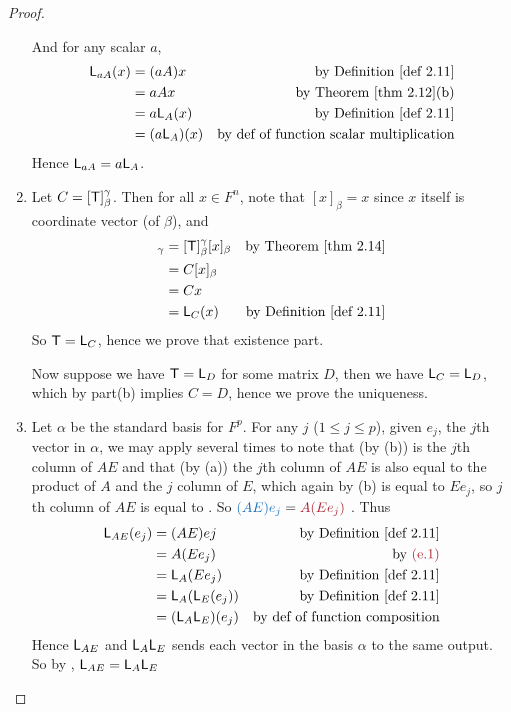 \begin{proof}
\begin{enumerate}
And for any scalar \(a\),
\begin{align*}
    \LMTRAN_{aA}(x) & = (aA)x & \text{by \DEF{2.11}} \\
                       & = aAx & \text{by \THM{2.12}(b)} \\
                       & = a\LMTRAN_A(x) & \text{by \DEF{2.11}} \\
                       & = (a\LMTRAN_A)(x) & \text{by def of function scalar multiplication}
\end{align*}
Hence \(\textsf{L}_{aA} = a\textsf{L}_A\).

\item
Let \(C = [\textsf{T}]_{\beta}^{\gamma}\).
Then for all \(x \in F^n\), note that \([x]_{\beta} = x\) since \(x\) itself is coordinate vector (of \(\beta\)), and
\begin{align*}
    [\T(x)]_{\gamma} & = [\T]_{\beta}^{\gamma}[x]_{\beta} & \text{by \THM{2.14}} \\
                     & = C [x]_{\beta} \\
                     & = C x \\
                     & = \LMTRAN_C(x) & \text{by \DEF{2.11}}
\end{align*}
So \(\textsf{T} = \textsf{L}_C\), hence we prove that existence part.

Now suppose we have \(\textsf{T} = \textsf{L}_D\) for some matrix \(D\), then we have \(\textsf{L}_C = \textsf{L}_D\), which by part(b) implies \(C = D\), hence we prove the uniqueness.

\item
Let \(\alpha\) be the standard basis for \(F^p\).
For any \(j\) (\(1 \le j \le p\)), given \(e_j\), the \(j\)th vector in \(\alpha\), we may apply  several times to note that (by (b))  is the \(j\)th column of \(AE\) and that (by (a)) the \(j\)th column of \(AE\) is also equal to the product of \(A\) and the \(j\) column of \(E\), which again by (b) is equal to \(Ee_j\), so \(j\)th column of \(AE\) is equal to .
So \(\BLUE{(AE)e_j} = \MAROON{A(Ee_j)}\) .
Thus
\begin{align*}
    \LMTRAN_{AE}(e_j) & = (AE)ej & \text{by \DEF{2.11}} \\
                      & = A(Ee_j) & \text{by \MAROON{(e.1)}} \\
                      & = \LMTRAN_A(Ee_j) & \text{by \DEF{2.11}} \\
                      & = \LMTRAN_A(\LMTRAN_E(e_j)) & \text{by \DEF{2.11}} \\
                      & = (\LMTRAN_A \LMTRAN_E)(e_j) & \text{by def of function composition}
\end{align*}
Hence \(\textsf{L}_{AE}\) and \(\textsf{L}_A \textsf{L}_E\) sends each vector in the basis \(\alpha\) to the same output.
So by , \(\textsf{L}_{AE} = \textsf{L}_A \textsf{L}_E\)


\end{enumerate}
\end{proof}
